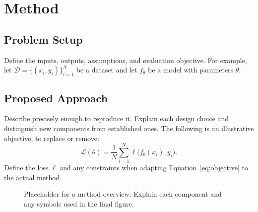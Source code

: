 \section{Method}
\label{sec:method}
\subsection{Problem Setup}
Define the inputs, outputs, assumptions, and evaluation objective.
For example, let $\mathcal{D}=\{(x_i,y_i)\}_{i=1}^{N}$ be a dataset and
let $f_\theta$ be a model with parameters $\theta$.

\subsection{Proposed Approach}
Describe \methodname{} precisely enough to reproduce it. Explain each
design choice and distinguish new components from established ones.
The following is an illustrative objective, to replace or remove:
\begin{equation}
  \label{eq:objective}
  \mathcal{L}(\theta)=\frac{1}{N}\sum_{i=1}^{N}
  \ell\bigl(f_\theta(x_i),y_i\bigr).
\end{equation}
Define the loss $\ell$ and any constraints when adapting
Equation~\eqref{eq:objective} to the actual method.

\begin{figure}[t]
  \centering
  \caption{Placeholder for a method overview. Explain each component
  and any symbols used in the final figure.}
  \label{fig:overview}
\end{figure}
